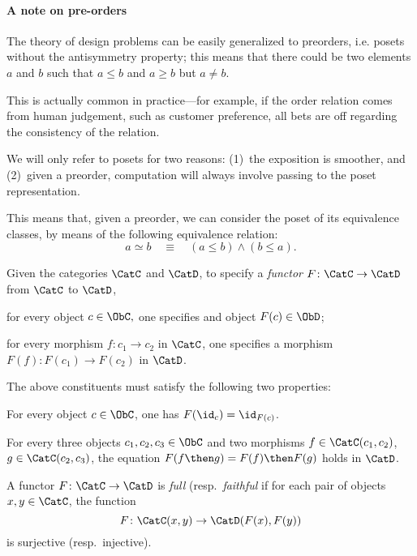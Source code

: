 

\paragraph{A note on pre-orders}

    The theory of design problems can be easily generalized to preorders, i.e. posets without the antisymmetry property; this means that there could be two elements $a$ and $b$ such that $a\leq b$ and $a \geq b$ but $a \neq b$.


    This is actually common in practice---for example, if the order relation comes from human judgement, such as customer preference, all bets are off regarding the consistency of the relation.

    We will only refer to posets for two reasons: (1)~the exposition is smoother, and (2)~given a preorder, computation will always involve passing to the poset representation.

    This means that, given a preorder, we can consider the poset of its equivalence classes, by means of the following equivalence relation:
    \begin{equation}
        a \simeq b \quad \equiv \quad (a \leq b) \wedge (b \leq a).
    \end{equation}%
    
\begin{shaded}
\begin{definition}[Functor]
\label{def:functor}
Given the categories $\CatC$ and $\CatD$, to specify a \emph{functor} $F\colon \CatC\to \CatD$ from $\CatC$ to $\CatD$,
\begin{compactenum}
    \item for every object $c\in \ObC,$ one specifies and object $F(c)\in \ObD$;
    \item for every morphism $f\colon c_1\to c_2$ in $\CatC$, one specifies a morphism $F(f)\colon F(c_1)\to F(c_2)$ in $\CatD$.
\end{compactenum}
The above constituents must satisfy the following two properties:
\begin{compactenum}[(a)]
    \item For every object $c\in \ObC$, one has $F(\id_c)=\id_{F(c)}$.
    \item For every three objects $c_1,c_2,c_3 \in \ObC$ and two morphisms $f\in \CatC(c_1,c_2)$, $g\in \CatC(c_2,c_3)$, the equation $F(f\then g)=F(f)\then F(g)$ holds in $\CatD$.
\end{compactenum}
\end{definition}

\begin{definition}
\label{def:functorfullfaith}
A functor $F\colon \CatC \to \CatD$ is \emph{full} (resp.\ \emph{faithful} if for each pair of objects $x,y\in \CatC$, the function
\begin{equation}
    F\colon \CatC(x,y)\to \CatD(F(x),F(y))
\end{equation}
is surjective (resp.\ injective).
\end{definition}
\end{shaded}
